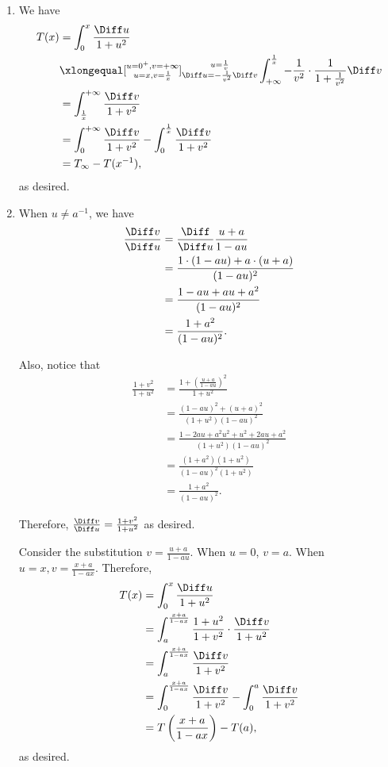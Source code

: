 \Question{\currfilebase}

\begin{enumerate}
    \item We have
    \begin{align*}
        T(x) &= \int_0^x \frac{\Diff u}{1 + u^2}\\
        &\xlongequal[\substack{u=0^+, v=+\infty\\
        u=x, v=\frac{1}{x}}]{\substack{u = \frac{1}{v}\\
        \Diff u = - \frac{1}{v^2} \Diff v}} \int_{+\infty}^{\frac{1}{x}} -\frac{1}{v^2} \cdot \frac{1}{1 + \frac{1}{v^2}} \Diff v\\
        &= \int_{\frac{1}{x}}^{+\infty} \frac{\Diff v}{1 + v^2}\\
        &= \int_{0}^{+\infty} \frac{\Diff v}{1 + v^2} - \int_{0}^{\frac{1}{x}} \frac{\Diff v}{1 + v^2}\\
        &= T_{\infty} - T(x^{-1}),
    \end{align*}
    as desired.

    \item When \(u \neq a^{-1}\), we have
    \begin{align*}
        \frac{\Diff v}{\Diff u} &= \frac{\Diff}{\Diff u} \frac{u+a}{1-au}\\
        &= \frac{1 \cdot (1-au) + a \cdot (u+a)}{(1-au)^2}\\
        &= \frac{1 - au + au + a^2}{(1-au)^2}\\
        &= \frac{1 + a^2}{(1-au)^2}.
    \end{align*}

    Also, notice that
    \begin{align*}
        \frac{1 + v^2}{1 + u^2} &= \frac{1 + \left(\frac{u + a}{1 - au}\right)^2}{1 + u^2}\\
        &= \frac{(1-au)^2 + (u+a)^2}{(1+u^2) (1-au)^2}\\
        &= \frac{1 - 2au + a^2u^2 + u^2 + 2au + a^2}{(1+u^2) (1-au)^2}\\
        &= \frac{(1 + a^2) (1 + u^2)}{(1 - au)^2 (1 + u^2)}\\
        &= \frac{1 + a^2}{(1 - au)^2}.
    \end{align*}

    Therefore, \(\frac{\Diff v}{\Diff u} = \frac{1 + v^2}{1 + u^2}\) as desired.

    Consider the substitution \(v = \frac{u + a}{1 - au}\). When \(u = 0\), \(v = a\). When \(u = x, v = \frac{x + a}{1 - ax}\). Therefore,
    \begin{align*}
        T(x) &= \int_0^x \frac{\Diff u}{1 + u^2}\\
        &= \int_a^{\frac{x+a}{1-ax}} \frac{1+u^2}{1+v^2} \cdot \frac{\Diff v}{1 + u^2}\\
        &= \int_a^{\frac{x+a}{1-ax}} \frac{\Diff v}{1 + v^2}\\
        &= \int_0^{\frac{x+a}{1-ax}} \frac{\Diff v}{1 + v^2} - \int_0^a \frac{\Diff v}{1 + v^2}\\
        &= T\left(\frac{x+a}{1-ax}\right) - T(a),
    \end{align*}
    as desired.


\end{enumerate}
